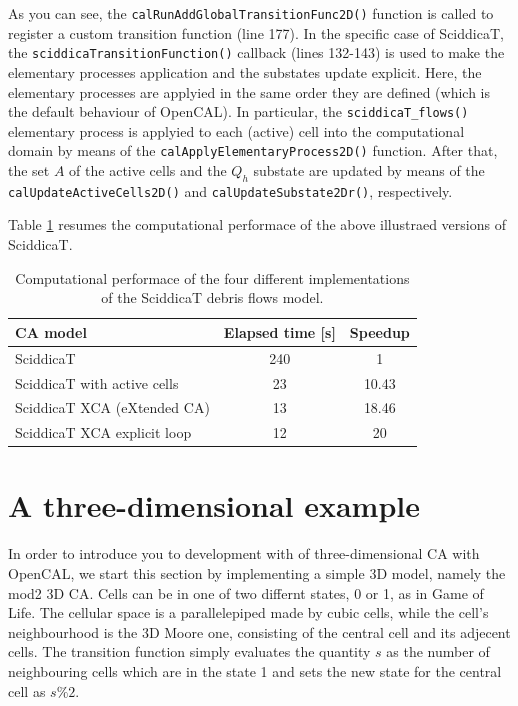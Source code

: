 As you can see, the \verb'calRunAddGlobalTransitionFunc2D()' function
is called to register a custom transition function (line 177). In the
specific case of SciddicaT, the \verb'sciddicaTransitionFunction()'
callback (lines 132-143) is used to make the elementary processes
application and the substates update explicit. Here, the elementary
processes are applyied in the same order they are defined (which is
the default behaviour of OpenCAL). In particular, the
\verb'sciddicaT_flows()' elementary process is applyied to each
(active) cell into the computational domain by means of the
\verb'calApplyElementaryProcess2D()' function. After that, the set $A$
of the active cells and the $Q_h$ substate are updated by means of the
\verb'calUpdateActiveCells2D()' and \verb'calUpdateSubstate2Dr()',
respectively.



Table \ref{tab:speedup} resumes the
computational performace of the above illustraed versions of
SciddicaT.

\begin{table}
  \centering
  \begin{tabular}{l|c|c}
    \hline
    CA model & Elapsed time [s] & Speedup \\
    \hline
    \hline
    SciddicaT                   & 240 & 1\\
    SciddicaT with active cells & 23  & 10.43\\
    SciddicaT XCA (eXtended CA) & 13  & 18.46\\
    SciddicaT XCA explicit loop & 12  & 20\\
    \hline
  \end{tabular}
  \caption{Computational performace of the four different
    implementations of the SciddicaT debris flows model.}
  \label{tab:speedup}
\end{table} 


\section{A three-dimensional example}

In order to introduce you to development with of three-dimensional CA
with OpenCAL, we start this section by implementing a simple 3D model,
namely the mod2 3D CA. Cells can be in one of two differnt states, 0
or 1, as in Game of Life. The cellular space is a parallelepiped made
by cubic cells, while the cell's neighbourhood is the 3D Moore one,
consisting of the central cell and its adjecent cells. The transition
function simply evaluates the quantity $s$ as the number of
neighbouring cells which are in the state 1 and sets the new state for
the central cell as $s\%2$.

